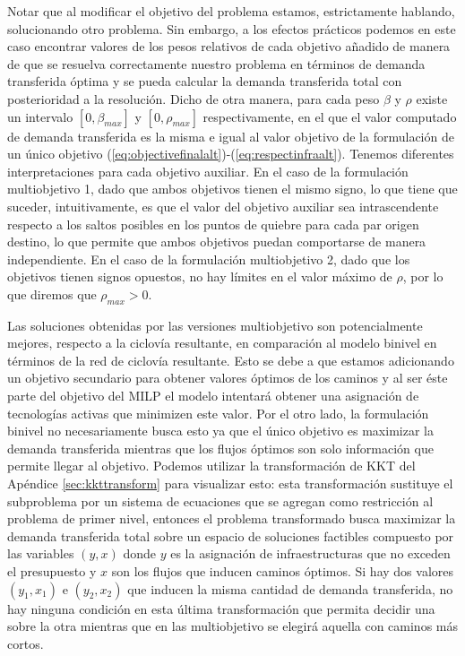 Notar que al modificar el objetivo del problema estamos, estrictamente hablando, solucionando otro problema. Sin embargo, a los efectos prácticos podemos en este caso encontrar valores de los pesos relativos de cada objetivo añadido de manera de que se resuelva correctamente nuestro problema en términos de demanda transferida óptima y se pueda calcular la demanda transferida total con posterioridad a la resolución. Dicho de otra manera, para cada peso $\beta$ y $\rho$ existe un intervalo $[0, \beta_{max}]$ y $[0, \rho_{max}]$ respectivamente, en el que el valor computado de demanda transferida es la misma e igual al valor objetivo de la formulación de un único objetivo (\ref{eq:objectivefinalalt})-(\ref{eq:respectinfraalt}). Tenemos diferentes interpretaciones para cada objetivo auxiliar. En el caso de la formulación multiobjetivo 1, dado que ambos objetivos tienen el mismo signo, lo que tiene que suceder, intuitivamente, es que el valor del objetivo auxiliar sea intrascendente respecto a los saltos posibles en los puntos de quiebre para cada par origen destino, lo que permite que ambos objetivos puedan comportarse de manera independiente. En el caso de la formulación multiobjetivo 2, dado que los objetivos tienen signos opuestos, no hay límites en el valor máximo de $\rho$, por lo que diremos que $\rho_{max} > 0$.

Las soluciones obtenidas por las versiones multiobjetivo son potencialmente mejores, respecto a la ciclovía resultante, en comparación al modelo binivel en términos de la red de ciclovía resultante. Esto se debe a que estamos adicionando un objetivo secundario para obtener valores óptimos de los caminos y al ser éste parte del objetivo del MILP el modelo intentará obtener una asignación de tecnologías activas que minimizen este valor. Por el otro lado, la formulación binivel no necesariamente busca esto ya que el único objetivo es maximizar la demanda transferida mientras que los flujos óptimos son solo información que permite llegar al objetivo. Podemos utilizar la transformación de KKT del Apéndice \ref{sec:kkttransform} para visualizar esto: esta transformación sustituye el subproblema por un sistema de ecuaciones que se agregan como restricción al problema de primer nivel, entonces el problema transformado busca maximizar la demanda transferida total sobre un espacio de soluciones factibles compuesto por las variables $(y, x)$ donde $y$ es la asignación de infraestructuras que no exceden el presupuesto y $x$ son los flujos que inducen caminos óptimos. Si hay dos valores $(y_1, x_1)$ e $(y_2, x_2)$ que inducen la misma cantidad de demanda transferida, no hay ninguna condición en esta última transformación que permita decidir una sobre la otra mientras que en las multiobjetivo se elegirá aquella con caminos más cortos.

